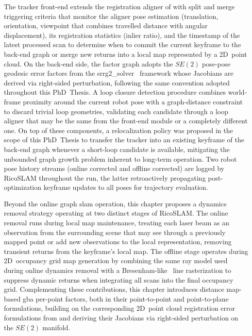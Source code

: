 The tracker front-end extends the registration aligner of
 with split and merge triggering criteria
that monitor the aligner pose estimation (translation, orientation, viewpoint
that combines travelled distance with angular displacement), its registration
statistics (inlier ratio), and the timestamp of the latest processed scan
to determine when to commit the current keyframe to the back-end graph or
merge new returns into a local map represented by a 2D~point cloud.
On the back-end side, the factor graph adopts the $SE(2)$ pose-pose geodesic
error factors from the srrg2\_solver~\cite{grisetti:robotics:2020} framework
whose Jacobians are derived via right-sided perturbation,
following the same convention adopted throughout this PhD~Thesis.
A loop closure detection procedure combines world-frame proximity around the
current robot pose with a graph-distance constraint to discard trivial loop
geometries, validating each candidate through a loop aligner that may be the
same from the front-end module or a completely different one.
On top of these components, a relocalization policy was proposed in the
scope of this PhD~Thesis to transfer the tracker into an existing keyframe of
the back-end graph whenever a short-loop candidate is available,
mitigating the unbounded graph growth problem inherent to long-term operation.
Two robot pose history streams (online corrected and offline corrected) are
logged by RicoSLAM throughout the run, the latter retroactively propagating
post-optimization keyframe updates to all poses for trajectory evaluation.

Beyond the online graph \gls{slam} operation,
this chapter proposes a dynamics removal
strategy operating at two distinct stages of RicoSLAM. The online removal
runs during local map maintenance, treating each laser beam as an observation
from the surrounding scene that may see through a previously mapped point or add new
observations to the local representation, removing transient returns from
the keyframe's local map. The offline stage operates during 2D~occupancy
grid map generation by combining the same ray model used during online dynamics removal with a
Bresenham-like~\cite{bresenham:ibm:1965,zingl:uas:2016} line rasterization
to suppress dynamic returns when integrating all scans into the final
occupancy grid. Complementing these contributions, this chapter introduces
distance map-based \gls{gba} per-point factors, both in their
point-to-point and point-to-plane formulations, building on the
corresponding 2D~point cloud registration error formulations from
 and deriving their Jacobians via right-sided
perturbation on the $SE(2)$ manifold.


